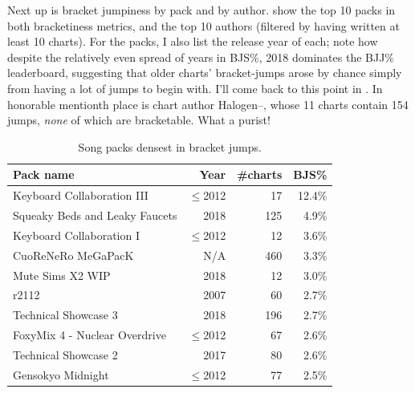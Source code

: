 \documentclass[10pt]{sigplanconf}
\begin{document}
Next up is bracket jumpiness by pack and by author.
 show the top 10 packs in both bracketiness metrics,
and  the top 10 authors
(filtered by having written at least 10 charts).
For the packs, I also list the release year of each;
note how despite the relatively even spread of years in BJS\%,
2018 dominates the BJJ\% leaderboard,
suggesting that older charts' bracket-jumps arose by chance simply from having a lot of jumps to begin with.
I'll come back to this point in .
In honorable mentionth place is chart author \mbox{Halogen--,} whose 11 charts contain 154 jumps, \textit{none} of which are bracketable.
What a purist!

\begin{table}[t]
	\begin{center}
		\small
	\begin{tabular}{l|r|r|r}
		\bf Pack name & \bf Year & \bf \#charts & \bf BJS\% \\
		\hline
		Keyboard Collaboration III		& $\le$2012	&  17 & 12.4\% \\
		Squeaky Beds and Leaky Faucets		& 2018	& 125 &  4.9\% \\
		Keyboard Collaboration I		& $\le$2012	&  12 &  3.6\% \\
		CuoReNeRo MeGaPacK			& N/A	& 460 &  3.3\% \\
		Mute Sims X2 WIP			& 2018	&  12 &  3.0\% \\
		r2112					& 2007	&  60 &  2.7\% \\
		Technical Showcase 3			& 2018	& 196 &  2.7\% \\
		FoxyMix 4 - Nuclear Overdrive		& $\le$2012	&  67 &  2.6\% \\
		Technical Showcase 2			& 2017	&  80 &  2.6\% \\
		Gensokyo Midnight			& $\le$2012 	&  77 &  2.5\% \\
	\end{tabular}
	\end{center}
	\caption{Song packs densest in bracket jumps.}
	\label{tab:pack-bjs}
\end{table}
\end{document}
